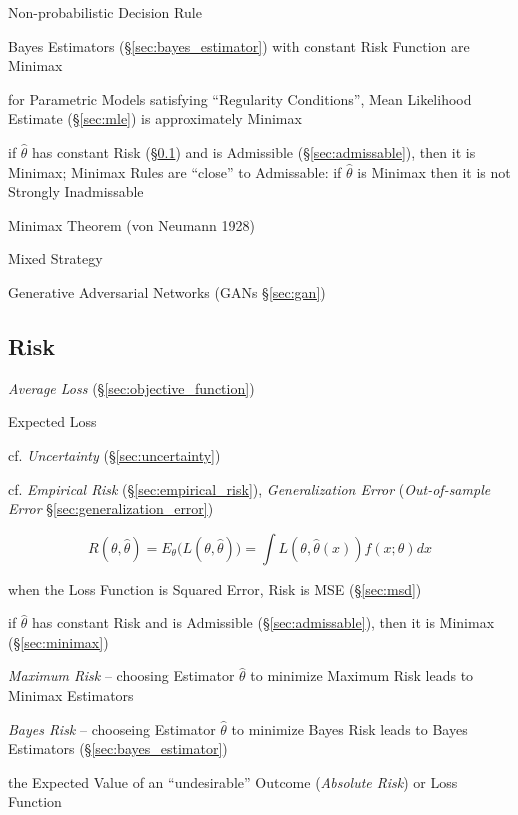 Non-probabilistic Decision Rule

Bayes Estimators (\S\ref{sec:bayes_estimator}) with constant Risk Function are
Minimax

for Parametric Models satisfying ``Regularity Conditions'', Mean Likelihood
Estimate (\S\ref{sec:mle}) is approximately Minimax

if $\hat{\theta}$ has constant Risk (\S\ref{sec:risk}) and is Admissible
(\S\ref{sec:admissable}), then it is Minimax;
Minimax Rules are ``close'' to Admissable: if $\hat{\theta}$ is Minimax then it
is not Strongly Inadmissable

Minimax Theorem (von Neumann 1928)

Mixed Strategy

\fist Generative Adversarial Networks (GANs \S\ref{sec:gan})



\subsection{Risk}\label{sec:risk}

\emph{Average Loss} (\S\ref{sec:objective_function})

Expected Loss

cf. \emph{Uncertainty} (\S\ref{sec:uncertainty})

cf. \emph{Empirical Risk} (\S\ref{sec:empirical_risk}), \emph{Generalization
Error} (\emph{Out-of-sample Error} \S\ref{sec:generalization_error})

\[
  R(\theta,\hat{\theta}) = E_\theta\Big(L(\theta,\hat{\theta})\Big) =
    \int L(\theta,\hat{\theta}(x))f(x;\theta) dx
\]

when the Loss Function is Squared Error, Risk is MSE (\S\ref{sec:msd})

if $\hat{\theta}$ has constant Risk and is Admissible (\S\ref{sec:admissable}),
then it is Minimax (\S\ref{sec:minimax})

\emph{Maximum Risk} -- choosing Estimator $\hat{\theta}$ to minimize Maximum
Risk leads to Minimax Estimators

\emph{Bayes Risk} -- chooseing Estimator $\hat{\theta}$ to minimize Bayes Risk
leads to Bayes Estimators (\S\ref{sec:bayes_estimator})

the Expected Value of an ``undesirable'' Outcome (\emph{Absolute Risk}) or Loss
Function

